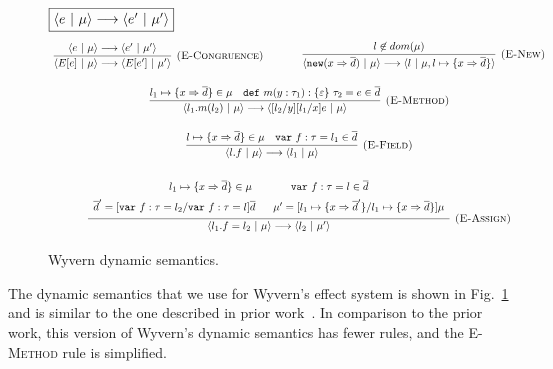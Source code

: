 \begin{figure}[t]
\flushleft
\footnotesize{
$\fbox{$\langle e~|~\mu \rangle \longrightarrow \langle e'~|~\mu' \rangle$}$
\[
\begin{array}{c}
\infer[\textsc{(E-Congruence)}]
  {\langle E[e]~|~\mu \rangle \longrightarrow \langle E[e']~|~\mu' \rangle}
  {\langle e~|~\mu \rangle \longrightarrow \langle e'~|~\mu' \rangle} \quad \quad
~~~~~
\infer[\textsc{(E-New)}]
  {\langle \keywadj{new} (x \Rightarrow \overline{d})~|~\mu \rangle \longrightarrow \langle l~|~\mu, l \mapsto \{ x \Rightarrow \overline{d} \} \rangle}
  {l \not\in dom(\mu)}\\[3ex]

\infer[\textsc{(E-Method)}]
  {\langle l_1.m(l_2)~|~\mu \rangle \longrightarrow \langle [l_2/y][l_1/x]e~|~\mu \rangle}
  {l_1 \mapsto \{ x \Rightarrow \overline{d} \} \in \mu & \keyw{def} m(y : \tau_1) : \{ \varepsilon \}~\tau_2 = e \in \overline{d}}\\[3ex]
\infer[\textsc{(E-Field)}]
  {\langle l.f~|~\mu \rangle \longrightarrow \langle l_1~|~\mu \rangle}
  {l \mapsto \{ x \Rightarrow \overline{d} \} \in \mu & \keyw{var} f:\tau = l_1 \in \overline{d}}\\[3ex]

\infer[\textsc{(E-Assign)}]
  {\langle l_1.f = l_2~|~\mu \rangle \longrightarrow \langle l_2~|~\mu' \rangle}
  {\def\arraystretch{1.6}
  \begin{array}{c}
l_1 \mapsto \{ x \Rightarrow \overline{d} \} \in \mu~~~~~~~~~~~\keyw{var} f:\tau = l \in \overline{d} \\
\overline{d}' = [\keyw{var} f:\tau = l_2/\keyw{var} f:\tau = l]\overline{d}~~~~~\mu' = [l_1 \mapsto \{ x \Rightarrow \overline{d}' \}/l_1 \mapsto \{ x \Rightarrow \overline{d} \}]\mu
  \end{array}}%
\end{array}
\]
}
\caption{Wyvern dynamic semantics.}
\label{f-effects-dynamic-semantics}
\end{figure}

The dynamic semantics that we use for Wyvern's effect system is shown in Fig.~\ref{f-effects-dynamic-semantics} and is similar to the one described in prior work~\cite{melicher17}. In comparison to the prior work, this version of Wyvern's dynamic semantics has fewer rules, and the \textsc{E-Method} rule is simplified.

